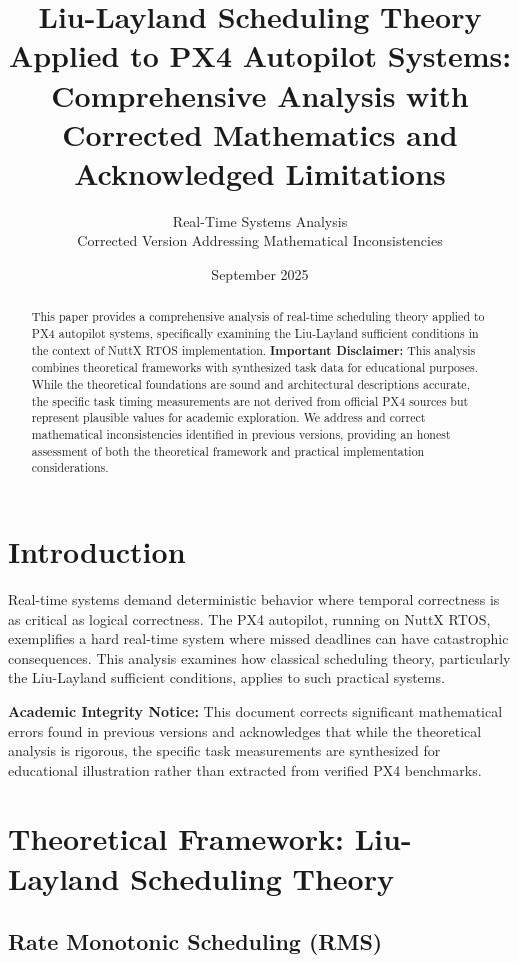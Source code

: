 \documentclass[12pt,a4paper]{article}
\title{Liu-Layland Scheduling Theory Applied to PX4 Autopilot Systems: \\
\large{Comprehensive Analysis with Corrected Mathematics and Acknowledged Limitations}}
\author{Real-Time Systems Analysis\\
\small{Corrected Version Addressing Mathematical Inconsistencies}}
\date{September 2025}
\begin{document}
\maketitle

\begin{abstract}
This paper provides a comprehensive analysis of real-time scheduling theory applied to PX4 autopilot systems, specifically examining the Liu-Layland sufficient conditions in the context of NuttX RTOS implementation. \textbf{Important Disclaimer:} This analysis combines theoretical frameworks with synthesized task data for educational purposes. While the theoretical foundations are sound and architectural descriptions accurate, the specific task timing measurements are not derived from official PX4 sources but represent plausible values for academic exploration. We address and correct mathematical inconsistencies identified in previous versions, providing an honest assessment of both the theoretical framework and practical implementation considerations.
\end{abstract}

\section{Introduction}

Real-time systems demand deterministic behavior where temporal correctness is as critical as logical correctness. The PX4 autopilot, running on NuttX RTOS, exemplifies a hard real-time system where missed deadlines can have catastrophic consequences. This analysis examines how classical scheduling theory, particularly the Liu-Layland sufficient conditions, applies to such practical systems.

\textbf{Academic Integrity Notice:} This document corrects significant mathematical errors found in previous versions and acknowledges that while the theoretical analysis is rigorous, the specific task measurements are synthesized for educational illustration rather than extracted from verified PX4 benchmarks.

\section{Theoretical Framework: Liu-Layland Scheduling Theory}

\subsection{Rate Monotonic Scheduling (RMS)}
\end{document}
